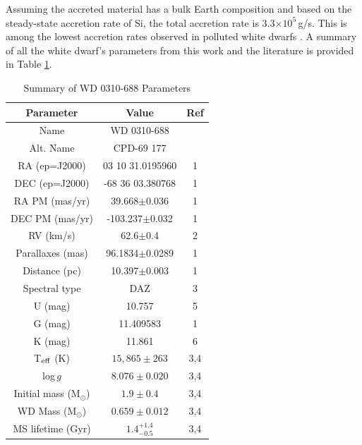 \documentclass[twocolumn]{aastex631}
\begin{document}
Assuming the accreted material has a bulk Earth composition {and based on the steady-state accretion rate of Si}, the total accretion rate is 3.3$\times10^5$\,g/s. This is among the lowest accretion rates observed in polluted white dwarfs \citep{2022MNRAS.510.1059B}. A summary of all the white dwarf's parameters from this work and the literature is provided in Table \ref{tab:parameters2}.



\begin{table}[h]
\centering
\caption{Summary of WD 0310-688 Parameters}
\label{tab:parameters2}
\begin{tabular}{c|c|c}
Parameter & Value & Ref\\ 
\hline 
Name & WD 0310-688 &\\
Alt. Name & CPD-69 177 &\\
RA (ep=J2000) &	03 10 31.0195960 & 1\\
DEC (ep=J2000) &-68 36 03.380768 & 1\\
RA PM (mas/yr) & 39.668$\pm$0.036  &1\\
DEC PM (mas/yr) & -103.237$\pm$0.032 & 1\\
RV (km/s) & 62.6$\pm$0.4 & 2\\
Parallaxes (mas) & 96.1834$\pm$0.0289 & 1\\
Distance (pc) & 10.397$\pm$0.003 & 1\\
Spectral type & DAZ & 3\\
U (mag) & 10.757 & 5\\
G (mag) & 11.409583 & 1\\
K (mag) & 11.861 & 6\\
T$_{\rm eff}$ (K) & $15,865 \pm 263$ &3,4\\
log\,$g$ & $8.076 \pm 0.020$ &3,4 \\
Initial mass (M$_\odot$) & $1.9 \pm 0.4$ &3,4\\
WD Mass (M$_\odot$) & $0.659 \pm 0.012$ &3,4\\
MS lifetime (Gyr) & $1.4_{-0.5}^{+1.4}$ & 3,4\\

\end{tabular}
\end{table}
\end{document}
